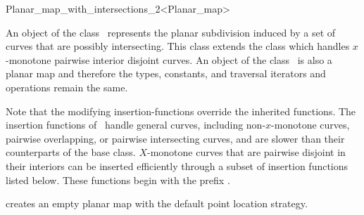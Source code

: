 
\ccRefPageBegin

\begin{ccRefClass}{Planar_map_with_intersections_2<Planar_map>}

\ccDefinition An object  of the class
    \ccClassTemplateName\ represents the planar
    subdivision induced by a set of curves that are possibly intersecting.
    This class extends the class 
    which handles $x$-monotone pairwise interior disjoint
    curves.  %
    An object of the class \ccClassTemplateName\ is also a planar map and
    therefore the types, constants, and traversal iterators and operations remain
    the same.


\ccInheritsFrom

    Note that the modifying insertion-functions override the
    inherited functions. The insertion functions of \ccRefName\ handle
    general curves, including non-$x$-monotone curves, pairwise overlapping,
    or pairwise intersecting curves, and are slower than their counterparts
    of the  base class.
    $X$-monotone curves that are pairwise disjoint in their interiors can be
    inserted efficiently through a subset of insertion functions listed below.
    These functions begin with the prefix .

\ccTypes


\ccCreation
{}

  {creates an empty planar map with the default point location strategy.}


\end{ccRefClass}
